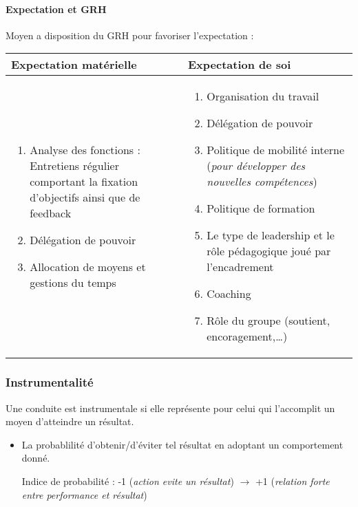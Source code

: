 \documentclass[11pt]{article} %
\begin{document}
\paragraph{\textbf{Expectation et GRH}}
Moyen a disposition du GRH pour favoriser l'expectation :

\begin{center}
\begin{tabular}{|m{6cm}|m{8cm}|}
	\hline
	\textbf{Expectation matérielle} & \textbf{Expectation de soi} \\
	\hline
    \begin{enumerate}
        \item Analyse des fonctions : Entretiens régulier comportant la
            fixation d'objectifs ainsi que de feedback
        \item Délégation de pouvoir 
        \item Allocation de moyens et gestions du temps 
    \end{enumerate}
     &
     \begin{enumerate}
         \item Organisation du travail
         \item Délégation de pouvoir
         \item Politique de mobilité interne (\textit{pour développer
             des nouvelles compétences})
	     \item Politique de formation
	     \item Le type de leadership et le rôle pédagogique joué par
             l'encadrement
	     \item Coaching
	     \item Rôle du groupe (soutient, encoragement,\ldots)
     \end{enumerate}
     \\
	\hline
\end{tabular}
\end{center}
 
\subsubsection{Instrumentalité} 
Une conduite est instrumentale si elle représente pour celui qui
l'accomplit un moyen d'atteindre un résultat.
\begin{itemize}
 \item La probablilité d'obtenir/d'éviter tel résultat en adoptant un
     comportement donné.

     Indice de probabilité : -1 (\textit{action evite un résultat})
     $\to$ +1 (\textit{relation forte entre performance et résultat})
\end{itemize}
\end{document}
